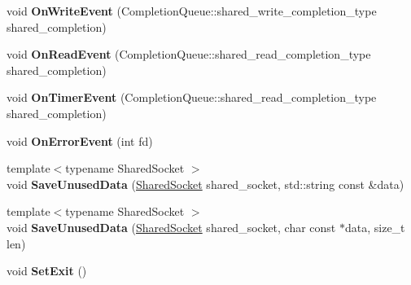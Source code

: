 \begin{DoxyCompactItemize}
\item 
\hypertarget{classlsf_1_1asio_1_1async_1_1ProactorSerivce_a872fd24926e09282061a63208a5d3ad5}{
void {\bfseries OnWriteEvent} (CompletionQueue::shared\_\-write\_\-completion\_\-type shared\_\-completion)}
\label{classlsf_1_1asio_1_1async_1_1ProactorSerivce_a872fd24926e09282061a63208a5d3ad5}

\item 
\hypertarget{classlsf_1_1asio_1_1async_1_1ProactorSerivce_a566a8f7b0578c2d12d1db5724f0cf28a}{
void {\bfseries OnReadEvent} (CompletionQueue::shared\_\-read\_\-completion\_\-type shared\_\-completion)}
\label{classlsf_1_1asio_1_1async_1_1ProactorSerivce_a566a8f7b0578c2d12d1db5724f0cf28a}

\item 
\hypertarget{classlsf_1_1asio_1_1async_1_1ProactorSerivce_aaa44b55e85cdadd8a55ec57d2ca1939c}{
void {\bfseries OnTimerEvent} (CompletionQueue::shared\_\-read\_\-completion\_\-type shared\_\-completion)}
\label{classlsf_1_1asio_1_1async_1_1ProactorSerivce_aaa44b55e85cdadd8a55ec57d2ca1939c}

\item 
\hypertarget{classlsf_1_1asio_1_1async_1_1ProactorSerivce_a0768e919c0d70e72a0c79133b124e53a}{
void {\bfseries OnErrorEvent} (int fd)}
\label{classlsf_1_1asio_1_1async_1_1ProactorSerivce_a0768e919c0d70e72a0c79133b124e53a}

\item 
\hypertarget{classlsf_1_1asio_1_1async_1_1ProactorSerivce_a290fc88522e84498d7050c2baa6dec7a}{
{\footnotesize template$<$typename SharedSocket $>$ }\\void {\bfseries SaveUnusedData} (\hyperlink{classlsf_1_1asio_1_1SharedSocket}{SharedSocket} shared\_\-socket, std::string const \&data)}
\label{classlsf_1_1asio_1_1async_1_1ProactorSerivce_a290fc88522e84498d7050c2baa6dec7a}

\item 
\hypertarget{classlsf_1_1asio_1_1async_1_1ProactorSerivce_a8cff2ec06820695cadcf2dd02766dfe1}{
{\footnotesize template$<$typename SharedSocket $>$ }\\void {\bfseries SaveUnusedData} (\hyperlink{classlsf_1_1asio_1_1SharedSocket}{SharedSocket} shared\_\-socket, char const $\ast$data, size\_\-t len)}
\label{classlsf_1_1asio_1_1async_1_1ProactorSerivce_a8cff2ec06820695cadcf2dd02766dfe1}

\item 
\hypertarget{classlsf_1_1asio_1_1async_1_1ProactorSerivce_a74f68a45feaab2a9b5a0eaa64058f7ba}{
void {\bfseries SetExit} ()}
\label{classlsf_1_1asio_1_1async_1_1ProactorSerivce_a74f68a45feaab2a9b5a0eaa64058f7ba}


\end{DoxyCompactItemize}
